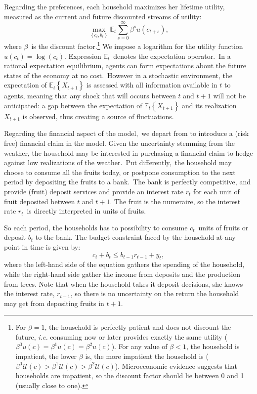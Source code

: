 \documentclass[a4paper,12pt]{article}%
\begin{document}
Regarding the preferences, each household maximizes her lifetime utility,
measured as the current and future discounted streams of utility:%
\begin{equation}
\max_{\left\{  c_{t},b_{t}\right\}  }\mathbb{E}_{t}\sum_{s=0}^{\infty}%
\beta^{s}u\left(  c_{t+s}\right)  , \label{fig: utility}%
\end{equation}
where $\beta$\ is the discount factor.\footnote{For $\beta=1$, the household
is perfectly patient and does not discount the future, \textit{i.e.} consuming
now or later provides exactly the same utility ($\beta^{0}u\left(  c\right)
=\beta^{1}u\left(  c\right)  =\beta^{2}u\left(  c\right)  $). For any value of
$\beta<1$, the household is impatient, the lower $\beta$ is, the more
impatient the household is ($\beta^{0}\mathcal{U}\left(  c\right)  >\beta
^{1}\mathcal{U}\left(  c\right)  >\beta^{2}\mathcal{U}\left(  c\right)  $).
Microeconomic evidence suggests that households are impatient, so the discount
factor should lie between 0 and 1 (usually close to one).} We impose a
logarithm for the utility function $u\left(  c_{t}\right)  =\log(c_{t})$.
Expression $\mathbb{E}_{t}$\ denotes the expectation operator.\ In a rational
expectation equilibrium, agents can form expectations about the future states
of the economy at no cost.\ However in a stochastic environment, the
expectation of $\mathbb{E}_{t}\left\{  X_{t+1}\right\}  $ is assessed with all
information available in $t$ to agents, meaning that any shock that will
occurs between $t$ and $t+1$ will not be anticipated: a gap between the
expectation of $\mathbb{E}_{t}\left\{  X_{t+1}\right\}  $ and its realization
$X_{t+1}$ is observed, thus creating a source of fluctuations.

Regarding the financial aspect of the model,\ we depart from
\cite{lucas1978asset} to introduce a (risk free) financial claim in the model.
Given the uncertainty stemming from the weather, the household may be
interested in purchasing a financial claim to hedge against low realizations
of the weather.\ Put differently,\ the household may choose to consume all the
fruits today, or postpone consumption to the next period by depositing the
fruits to a bank.\ The bank is perfectly competitive, and provide (fruit)
deposit services and provide an interest rate $r_{t}$ for each unit of fruit
deposited between $t$ and $t+1$. The fruit is the numeraire, so the interest
rate $r_{t}$\ is directly interpreted in units of fruits.

So each period, the households has to possibility to consume $c_{t}$\ units of
fruits or deposit $b_{t}$ to the bank. The budget constraint faced by the
household at any point in time is given by:%
\begin{equation}
c_{t}+b_{t}\leq b_{t-1}r_{t-1}+y_{t}, \label{eq:budget}%
\end{equation}
where the left-hand side of the equation gathers the spending of the
household, while the right-hand side gather the income from deposits and the
production from trees. Note that when the household takes it deposit
decisions, she knows the interest rate, $r_{t-1}$, so there is no uncertainty
on the return the household may get from depositing fruits in $t+1$.
\end{document}
